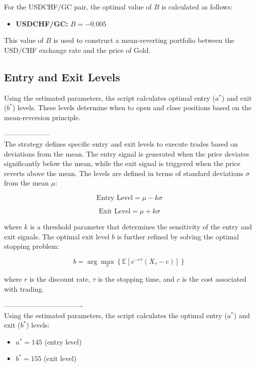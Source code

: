 \documentclass{article}
\begin{document}
For the USDCHF/GC pair, the optimal value of \( B \) is calculated as follows:
\begin{itemize}
    \item \textbf{USDCHF/GC:} \( B = -0.005 \)
\end{itemize}

This value of \( B \) is used to construct a mean-reverting portfolio between the USD/CHF exchange rate and the price of Gold.

\subsection*{Entry and Exit Levels}
Using the estimated parameters, the script calculates optimal entry ($a^*$) and exit ($b^*$) levels. These levels determine when to open and close positions based on the mean-reversion principle.

--------------------\\
The strategy defines specific entry and exit levels to execute trades based on deviations from the mean. The entry signal is generated when the price deviates significantly below the mean, while the exit signal is triggered when the price reverts above the mean. The levels are defined in terms of standard deviations \( \sigma \) from the mean \( \mu \):

\begin{equation}
\text{Entry Level} = \mu - k \sigma
\end{equation}

\begin{equation}
\text{Exit Level} = \mu + k \sigma
\end{equation}

where \( k \) is a threshold parameter that determines the sensitivity of the entry and exit signals. The optimal exit level \( b \) is further refined by solving the optimal stopping problem:

\begin{equation}
b = \arg \max_x \left\{ \mathbb{E} \left[ e^{-r \tau} (X_\tau - c) \right] \right\}
\end{equation}

where \( r \) is the discount rate, \( \tau \) is the stopping time, and \( c \) is the cost associated with trading.

----------------------------------\\

Using the estimated parameters, the script calculates the optimal entry ($a^*$) and exit ($b^*$) levels:

\begin{itemize}
    \item $a^* = 145$ \quad (entry level)
    \item $b^* = 155$ \quad (exit level)
\end{itemize}
\end{document}
